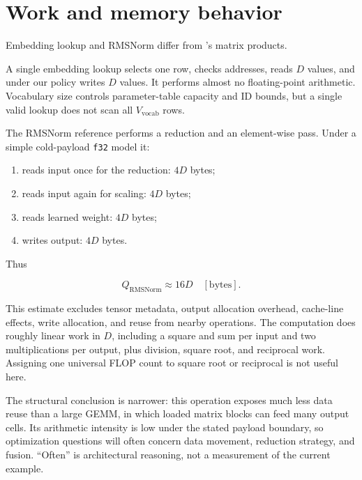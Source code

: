 \section{Work and memory behavior}\label{work-and-memory-behavior}


Embedding lookup and RMSNorm differ from 's matrix products.

A single embedding lookup selects one row, checks addresses, reads \(D\)
values, and under our policy writes \(D\) values. It performs almost no
floating-point arithmetic. Vocabulary size controls parameter-table
capacity and ID bounds, but a single valid lookup does not scan all
\(V_{\mathrm{vocab}}\) rows.

The RMSNorm reference performs a reduction and an element-wise pass.
Under a simple cold-payload \texttt{f32} model it:

\begin{enumerate}
\def\labelenumi{\arabic{enumi}.}
\tightlist
\item
  reads input once for the reduction: \(4D\) bytes;
\item
  reads input again for scaling: \(4D\) bytes;
\item
  reads learned weight: \(4D\) bytes;
\item
  writes output: \(4D\) bytes.
\end{enumerate}

Thus

\begin{equation}
Q_{\mathrm{RMSNorm}}\approx16D\quad[\mathrm{bytes}].
\end{equation}

This estimate excludes tensor metadata, output allocation overhead,
cache-line effects, write allocation, and reuse from nearby operations.
The computation does roughly linear work in \(D\), including a square
and sum per input and two multiplications per output, plus division,
square root, and reciprocal work. Assigning one universal FLOP count to
square root or reciprocal is not useful here.

The structural conclusion is narrower: this operation exposes much less
data reuse than a large GEMM, in which loaded matrix blocks can feed
many output cells. Its arithmetic intensity is low under the stated
payload boundary, so optimization questions will often concern data
movement, reduction strategy, and fusion. ``Often'' is architectural
reasoning, not a measurement of the current example.

